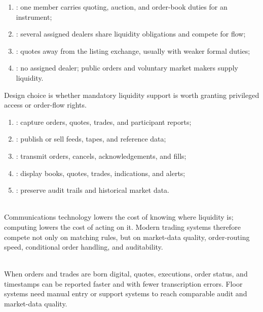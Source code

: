 \begin{taxonomy} 
\begin{enumerate}[label=\roman*.]
\setlength{\itemsep}{0pt}
\item {}: one member carries quoting, auction, and order-book duties for an instrument;
\item {}: several assigned dealers share liquidity obligations and compete for flow;
\item {}: quotes away from the listing exchange, usually with weaker formal duties;
\item {}: no assigned dealer; public orders and voluntary market makers supply liquidity.
\end{enumerate}
Design choice is whether mandatory liquidity support is worth granting privileged access or order-flow rights.
\end{taxonomy}

\begin{taxonomy} 
\begin{enumerate}[label=\roman*.]
\setlength{\itemsep}{0pt}
\item {}: capture orders, quotes, trades, and participant reports;
\item {}: publish or sell feeds, tapes, and reference data;
\item {}: transmit orders, cancels, acknowledgements, and fills;
\item {}: display books, quotes, trades, indications, and alerts;
\item {}: preserve audit trails and historical market data.
\end{enumerate}
\end{taxonomy}

\begin{mechanism} \\
Communications technology lowers the cost of knowing where liquidity is; computing lowers the cost of acting on it. Modern trading systems therefore compete not only on matching rules, but on market-data quality, order-routing speed, conditional order handling, and auditability.
\end{mechanism}

\begin{mechanism} \\
When orders and trades are born digital, quotes, executions, order status, and timestamps can be reported faster and with fewer transcription errors. Floor systems need manual entry or support systems to reach comparable audit and market-data quality.
\end{mechanism}

